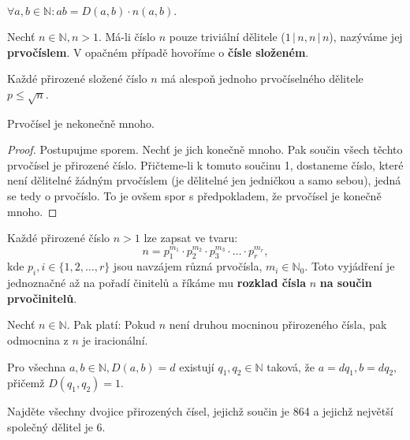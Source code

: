 \begin{veta}
  $\forall a,b \in \mathbb N: ab=D(a,b)\cdot n(a,b).$
\end{veta}

\begin{definition}
  Nechť $n\in \mathbb N, n>1.$ Má-li číslo $n$ pouze triviální dělitele ($1 \, | \, n, n \, | \, n$), nazýváme jej \textbf{prvočíslem}. V opačném případě hovoříme o \textbf{čísle složeném}.
\end{definition}

\begin{veta}
  Každé přirozené složené číslo $n$ má alespoň jednoho prvočíselného dělitele $p\leq \sqrt{n}$.
\end{veta}

\begin{veta}
  Prvočísel je nekonečně mnoho.
\end{veta}

\begin{proof}
  Postupujme sporem. Nechť je jich konečně mnoho. Pak součin všech těchto prvočísel je přirozené číslo.
  Přičteme-li k tomuto součinu 1, dostaneme číslo, které není dělitelné žádným prvočíslem (je dělitelné jen
  jedničkou a samo sebou), jedná se tedy o prvočíslo. To je ovšem spor s předpokladem, že prvočísel je konečně mnoho.
\end{proof}

\begin{veta}
  Každé přirozené číslo $n>1$ lze zapsat ve tvaru:
  $$n=p_1^{m_1}\cdot p_2^{m_2} \cdot p_3^{m_3}\cdot \hdots \cdot p_r^{m_r},$$
  kde $p_i,i\in\{ 1, 2, \dots, r \}$ jsou navzájem různá prvočísla, $m_i\in \mathbb N_0$. Toto vyjádření je jednoznačné až na pořadí činitelů a říkáme mu \textbf{rozklad čísla} $n$ \textbf{na součin prvočinitelů}.
\end{veta}

\begin{veta}
  Nechť $n\in \mathbb N.$ Pak platí: Pokud $n$ není druhou mocninou přirozeného čísla, pak odmocnina z $n$ je iracionální.
\end{veta}

\begin{veta}\label{existencedeleninevim}
    Pro všechna $a,b \in \mathbb N, D(a,b)=d$ existují $q_1, q_2\in \mathbb N$ taková,
    že $a=dq_1, b=dq_2, $ přičemž $D(q_1, q_2)=1.$
\end{veta}

\begin{priklad}
Najděte všechny dvojice přirozených čísel, jejichž součin je 864 a jejichž největší společný dělitel je 6.
\end{priklad}

